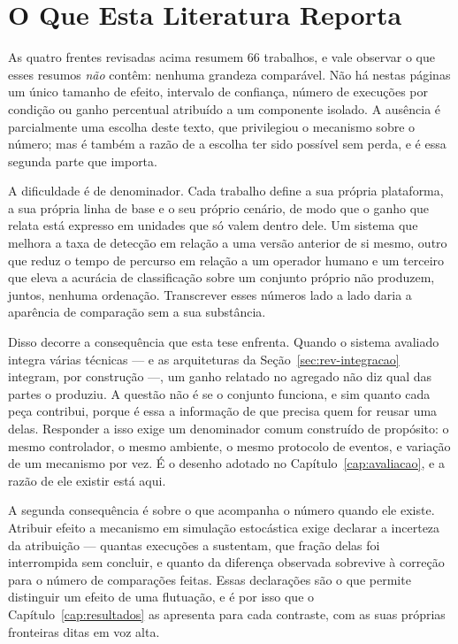 \section{O Que Esta Literatura Reporta}
\label{sec:rev-reporte}

As quatro frentes revisadas acima resumem $66$ trabalhos, e vale observar o que esses
resumos \emph{não} contêm: nenhuma grandeza comparável. Não há nestas páginas um único
tamanho de efeito, intervalo de confiança, número de execuções por condição ou ganho
percentual atribuído a um componente isolado. A ausência é parcialmente uma escolha
deste texto, que privilegiou o mecanismo sobre o número; mas é também a razão de a
escolha ter sido possível sem perda, e é essa segunda parte que importa.

A dificuldade é de denominador. Cada trabalho define a sua própria plataforma, a sua
própria linha de base e o seu próprio cenário, de modo que o ganho que relata está
expresso em unidades que só valem dentro dele. Um sistema que melhora a taxa de detecção
em relação a uma versão anterior de si mesmo, outro que reduz o tempo de percurso em
relação a um operador humano e um terceiro que eleva a acurácia de classificação sobre um
conjunto próprio não produzem, juntos, nenhuma ordenação. Transcrever esses números lado
a lado daria a aparência de comparação sem a sua substância.

Disso decorre a consequência que esta tese enfrenta. Quando o sistema avaliado integra
várias técnicas --- e as arquiteturas da Seção~\ref{sec:rev-integracao} integram, por
construção ---, um ganho relatado no agregado não diz qual das partes o produziu. A
questão não é se o conjunto funciona, e sim quanto cada peça contribui, porque é essa a
informação de que precisa quem for reusar uma delas. Responder a isso exige um
denominador comum construído de propósito: o mesmo controlador, o mesmo ambiente, o mesmo
protocolo de eventos, e variação de um mecanismo por vez. É o desenho adotado no
Capítulo~\ref{cap:avaliacao}, e a razão de ele existir está aqui.

A segunda consequência é sobre o que acompanha o número quando ele existe. Atribuir
efeito a mecanismo em simulação estocástica exige declarar a incerteza da atribuição ---
quantas execuções a sustentam, que fração delas foi interrompida sem concluir, e quanto
da diferença observada sobrevive à correção para o número de comparações feitas. Essas
declarações são o que permite distinguir um efeito de uma flutuação, e é por isso que o
Capítulo~\ref{cap:resultados} as apresenta para cada contraste, com as suas próprias
fronteiras ditas em voz alta.


